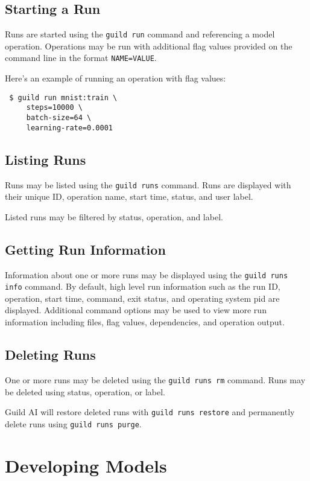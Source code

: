 \documentclass{article}
\begin{document}
\subsection{Starting a Run}

Runs are started using the \verb|guild run| command and referencing a
model operation. Operations may be run with additional flag values
provided on the command line in the format \verb|NAME=VALUE|.

Here's an example of running an operation with flag values:

{\footnotesize
\begin{verbatim}
 $ guild run mnist:train \
     steps=10000 \
     batch-size=64 \
     learning-rate=0.0001
\end{verbatim}}

\subsection{Listing Runs}

Runs may be listed using the \verb|guild runs| command. Runs are
displayed with their unique ID, operation name, start time, status,
and user label.

Listed runs may be filtered by status, operation, and label.

\subsection{Getting Run Information}

Information about one or more runs may be displayed using the
\verb|guild runs info| command. By default, high level run information
such as the run ID, operation, start time, command, exit status, and
operating system pid are displayed. Additional command options may be
used to view more run information including files, flag values,
dependencies, and operation output.

\subsection{Deleting Runs}

One or more runs may be deleted using the \verb|guild runs rm|
command. Runs may be deleted using status, operation, or label.

Guild AI will restore deleted runs with \verb|guild runs restore| and
permanently delete runs using \verb|guild runs purge|.

\section{Developing Models}
\end{document}
